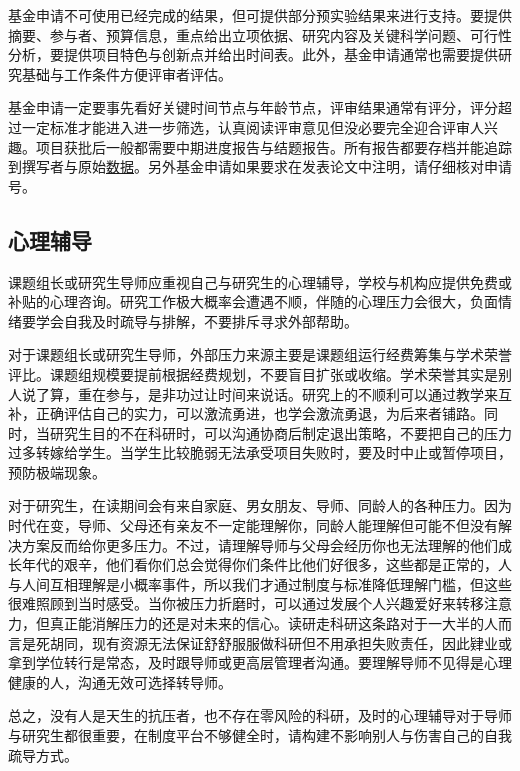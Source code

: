 \documentclass[]{tufte-book}
\begin{document}
基金申请不可使用已经完成的结果，但可提供部分预实验结果来进行支持。要提供摘要、参与者、预算信息，重点给出立项依据、研究内容及关键科学问题、可行性分析，要提供项目特色与创新点并给出时间表。此外，基金申请通常也需要提供研究基础与工作条件方便评审者评估。

基金申请一定要事先看好关键时间节点与年龄节点，评审结果通常有评分，评分超过一定标准才能进入进一步筛选，认真阅读评审意见但没必要完全迎合评审人兴趣。项目获批后一般都需要中期进度报告与结题报告。所有报告都要存档并能追踪到撰写者与原始\href{http://journals.plos.org/plosbiology/article?id=10.1371/journal.pbio.1002333}{数据}。另外基金申请如果要求在发表论文中注明，请仔细核对申请号。

\hypertarget{ux5fc3ux7406ux8f85ux5bfc}{%
\subsection{心理辅导}\label{ux5fc3ux7406ux8f85ux5bfc}}

课题组长或研究生导师应重视自己与研究生的心理辅导，学校与机构应提供免费或补贴的心理咨询。研究工作极大概率会遭遇不顺，伴随的心理压力会很大，负面情绪要学会自我及时疏导与排解，不要排斥寻求外部帮助。

对于课题组长或研究生导师，外部压力来源主要是课题组运行经费筹集与学术荣誉评比。课题组规模要提前根据经费规划，不要盲目扩张或收缩。学术荣誉其实是别人说了算，重在参与，是非功过让时间来说话。研究上的不顺利可以通过教学来互补，正确评估自己的实力，可以激流勇进，也学会激流勇退，为后来者铺路。同时，当研究生目的不在科研时，可以沟通协商后制定退出策略，不要把自己的压力过多转嫁给学生。当学生比较脆弱无法承受项目失败时，要及时中止或暂停项目，预防极端现象。

对于研究生，在读期间会有来自家庭、男女朋友、导师、同龄人的各种压力。因为时代在变，导师、父母还有亲友不一定能理解你，同龄人能理解但可能不但没有解决方案反而给你更多压力。不过，请理解导师与父母会经历你也无法理解的他们成长年代的艰辛，他们看你们总会觉得你们条件比他们好很多，这些都是正常的，人与人间互相理解是小概率事件，所以我们才通过制度与标准降低理解门槛，但这些很难照顾到当时感受。当你被压力折磨时，可以通过发展个人兴趣爱好来转移注意力，但真正能消解压力的还是对未来的信心。读研走科研这条路对于一大半的人而言是死胡同，现有资源无法保证舒舒服服做科研但不用承担失败责任，因此肄业或拿到学位转行是常态，及时跟导师或更高层管理者沟通。要理解导师不见得是心理健康的人，沟通无效可选择转导师。

总之，没有人是天生的抗压者，也不存在零风险的科研，及时的心理辅导对于导师与研究生都很重要，在制度平台不够健全时，请构建不影响别人与伤害自己的自我疏导方式。
\end{document}

